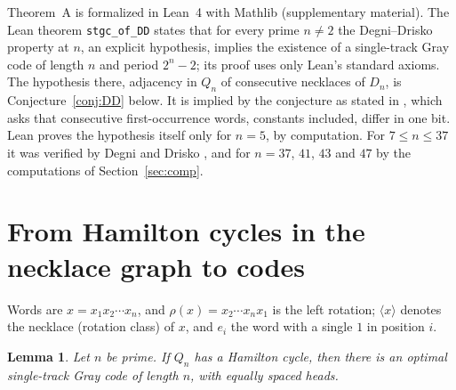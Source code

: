 \documentclass[journal,onecolumn,11pt]{IEEEtran}
\newtheorem{lemma}{Lemma}
\begin{document}
Theorem~A is formalized in Lean~4 with Mathlib (supplementary material). The Lean theorem \texttt{stgc\_of\_DD} states that for
every prime $n\ne 2$ the Degni--Drisko property at $n$, an explicit hypothesis, implies the existence of a single-track
Gray code of length $n$ and period $2^n-2$; its proof uses only Lean's standard axioms. The hypothesis there, adjacency in
$Q_n$ of consecutive necklaces of $D_n$, is Conjecture~\ref{conj:DD} below. It is implied by the conjecture as stated in
\cite{DD07}, which asks that consecutive first-occurrence words, constants included, differ in one bit. Lean proves the
hypothesis itself only for $n=5$, by computation. For $7\le n\le 37$ it was verified by Degni and Drisko
\cite{DD07}, and for $n=37$, $41$, $43$ and $47$ by the computations of Section~\ref{sec:comp}.

\section{From Hamilton cycles in the necklace graph to codes}

Words are $x=x_1x_2\cdots x_n$, and $\rho(x)=x_2\cdots x_nx_1$ is the left rotation; $\langle x\rangle$ denotes the
necklace (rotation class) of $x$, and $e_i$ the word with a single $1$ in position $i$.

\begin{lemma}\label{lem:V}
Let $n$ be prime. If $Q_n$ has a Hamilton cycle, then there is an optimal single-track Gray code of length $n$, with
equally spaced heads.
\end{lemma}
\end{document}
